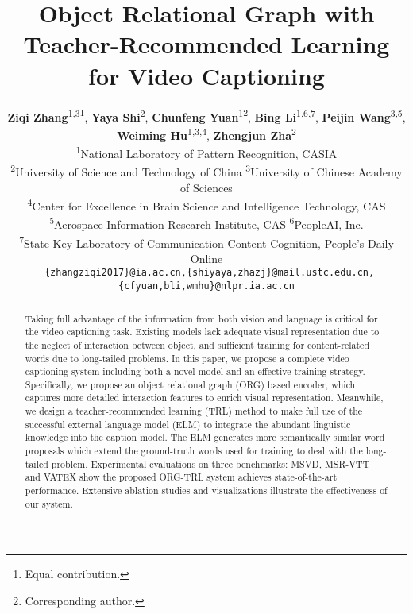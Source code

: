 \documentclass[10pt,twocolumn,letterpaper]{article}
\begin{document}
\title{Object Relational Graph with Teacher-Recommended Learning \\for Video Captioning}

\author{\textbf{Ziqi Zhang}\textsuperscript{1,3}\thanks{Equal contribution.}, 
		\textbf{Yaya Shi}\textsuperscript{2}\footnotemark[1],
		\textbf{Chunfeng Yuan}\textsuperscript{1}\thanks{Corresponding author.},
		\textbf{Bing Li}\textsuperscript{1,6,7},
		\textbf{Peijin Wang}\textsuperscript{3,5},
		\textbf{Weiming Hu}\textsuperscript{1,3,4},
		\textbf{Zhengjun Zha}\textsuperscript{2}\\
 \textsuperscript{1}National Laboratory of Pattern Recognition, CASIA\\\textsuperscript{2}University of Science and Technology of China \textsuperscript{3}University of Chinese Academy of Sciences\\
 \textsuperscript{4}Center for Excellence in Brain Science and Intelligence Technology, CAS\\
 \textsuperscript{5}Aerospace Information Research Institute, CAS \textsuperscript{6}PeopleAI, Inc.\\
  \textsuperscript{7}State Key Laboratory of Communication Content Cognition, People's Daily Online\\
 {\tt\small
  \{zhangziqi2017\}@ia.ac.cn,\{{shiyaya,zhazj}\}@mail.ustc.edu.cn,\{cfyuan,bli,wmhu\}@nlpr.ia.ac.cn}
 }



\maketitle


\begin{abstract} 
	Taking full advantage of the information from both vision and language is critical for the video captioning task. Existing models lack adequate visual representation due to the neglect of interaction between object, and sufficient training for content-related words due to long-tailed problems. In this paper, we propose a complete video captioning system including both a novel model and an effective training strategy. Specifically, we propose an object relational graph (ORG) based encoder, which captures more detailed interaction features to enrich visual representation. Meanwhile, we design a teacher-recommended learning (TRL) method to make full use of the successful external language model (ELM) to integrate the abundant linguistic knowledge into the caption model. The ELM generates more semantically similar word proposals which extend the ground-truth words used for training to deal with the long-tailed problem. Experimental evaluations on three benchmarks: MSVD, MSR-VTT and VATEX show the proposed ORG-TRL system achieves state-of-the-art performance. Extensive ablation studies and visualizations illustrate the effectiveness of our system.  
\end{abstract}
\end{document}
